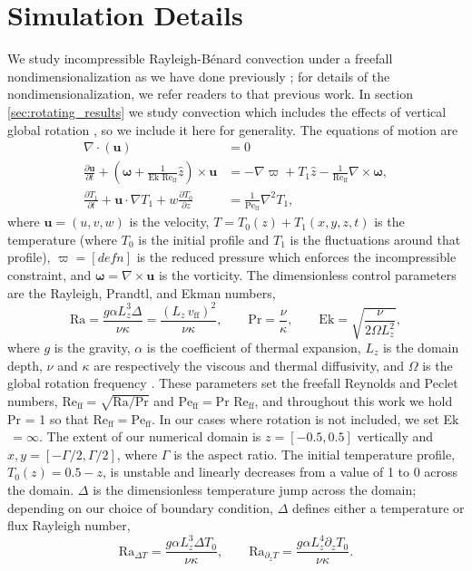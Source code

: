\documentclass[aps, pre, onecolumn, nofootinbib, notitlepage, groupedaddress, amsfonts, amssymb, amsmath, longbibliography]{revtex4-1}
\newcommand{\Div}[1]{\ensuremath{\nabla\cdot\left( #1\right)}}
\newcommand{\grad}{\ensuremath{\nabla}}
\newcommand{\RB}{Rayleigh-B\'{e}nard }
\newcommand{\Reff}{\ensuremath{\text{Re}_{\text{ff}}}}
\newcommand{\Peff}{\ensuremath{\text{Pe}_{\text{ff}}}}
\begin{document}

\section{Simulation Details}
\label{sec:simulations}
We study incompressible \RB convection under a freefall nondimensionalization as we have done previously \cite{anders&all2018}; for details of the nondimensionalization, we refer readers to that previous work.
In section \ref{sec:rotating_results} we study convection which includes the effects of vertical global rotation \cite{julien&all1996}, so we include it here for generality.
The equations of motion are
\begin{align}
\Div{\bm{u}} &= 0
	\label{eqn:incompressible}
\\
\frac{\partial \bm{u}}{\partial t} + \left(\bm{\omega} + \frac{1}{\text{Ek }\Reff}\hat{z}\right)\times\bm{u} 
&= - \grad \varpi + T_1\hat{z} - \frac{1}{\Reff}\grad\times\bm{\omega},
	\label{eqn:bouss_momentum}
\\
\frac{\partial T_1}{\partial t}  + \bm{u}\cdot\grad T_1 + w \frac{\partial T_0}{\partial z} 
&= \frac{1}{\Peff}\grad^2 T_1,
	\label{eqn:bouss_energy}
\end{align}
where $\bm{u} = (u, v, w)$ is the velocity, $T = T_0(z) + T_1(x, y, z, t)$ is the temperature (where $T_0$ is the initial profile and $T_1$ is the fluctuations around that profile), $\varpi = [defn]$ is the reduced pressure which enforces the incompressible constraint, and $\bm{\omega} = \grad \times \bm{u}$ is the vorticity.
The dimensionless control parameters are the Rayleigh, Prandtl, and Ekman numbers,
\begin{equation}
\text{Ra} = \frac{g \alpha L_z^3 \Delta}{\nu\kappa} = \frac{(L_z\,v_{\text{ff}})^2}{\nu\kappa}, \qquad \text{Pr} = \frac{\nu}{\kappa}, \qquad \text{Ek} = \sqrt{\frac{\nu}{2\Omega L_z^2}},
\end{equation}
where $g$ is the gravity, $\alpha$ is the coefficient of thermal expansion, $L_z$ is the domain depth, $\nu$ and $\kappa$ are respectively the viscous and thermal diffusivity, and $\Omega$ is the global rotation frequency \cite{anders&all2018}.
These parameters set the freefall Reynolds and Peclet numbers, $\Reff = \sqrt{\text{Ra}/\text{Pr}}$ and $\Peff = \text{Pr }\Reff$, and throughout this work we hold Pr = 1 so that $\Reff = \Peff$.
In our cases where rotation is not included, we set Ek$\,= \infty$.
The extent of our numerical domain is $z = [-0.5, 0.5]$ vertically and $x, y = [-\Gamma/2, \Gamma/2]$, where $\Gamma$ is the aspect ratio.
The initial temperature profile, $T_0(z) = 0.5 - z$, is unstable and linearly decreases from a value of 1 to 0 across the domain. 
$\Delta$ is the dimensionless temperature jump across the domain; depending on our choice of boundary condition, $\Delta$ defines either a temperature or flux Rayleigh number,
\begin{equation}
\text{Ra}_{\Delta T} = \frac{g \alpha L_z^3 \Delta T_0}{\nu\kappa}, \qquad 
\text{Ra}_{\partial_z T} = \frac{g \alpha L_z^4 \partial_z T_0}{\nu\kappa}.
\end{equation}
\end{document}

